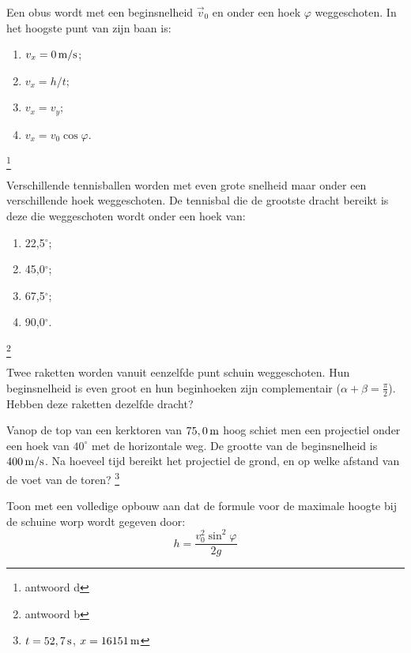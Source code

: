 \documentclass{ximera}
\begin{document}
\begin{exercise} Een obus wordt met een beginsnelheid $\vec{v}_0$ en onder een
hoek $\varphi$ weggeschoten. In het hoogste punt van zijn baan is:
\begin{enumerate}
\item $v_x=0\rm\,m/s$;
\item $v_x=h/t$;
\item $v_x=v_y$;
\item $v_x=v_0\cos{\varphi}$.
\end{enumerate}
\footnote{antwoord d}

\end{exercise}

\begin{exercise} Verschillende tennisballen worden met even grote snelheid maar
onder een verschillende hoek weggeschoten. De tennisbal die de
grootste dracht bereikt is deze die weggeschoten wordt onder een
hoek van:
\begin{enumerate}
\item 22,5$^\circ$;
\item 45,0$^\circ$;
\item 67,5$^\circ$;
\item 90,0$^\circ$.
\end{enumerate}
\footnote{antwoord b}

\end{exercise}

\begin{exercise} Twee raketten worden vanuit eenzelfde punt schuin
weggeschoten. Hun beginsnelheid is even groot en hun beginhoeken
zijn complementair ($\alpha+\beta=\frac{\pi}{2}$). Hebben deze
raketten dezelfde dracht?

\end{exercise}

\begin{exercise} Vanop de top van een kerktoren van $75,0\rm\,m$ hoog schiet
men een projectiel onder een hoek van $40^\circ$ met de horizontale
weg. De grootte van de beginsnelheid is $400\rm\,m/s$. Na hoeveel
tijd bereikt het projectiel de grond, en op welke afstand van de
voet van de toren? \footnote{$t=52,7\rm\,s$, $x=16151\rm\,m$}

\end{exercise}

\begin{exercise} Toon met een volledige opbouw aan dat de formule voor de
maximale hoogte bij de schuine worp wordt gegeven door:
\begin{displaymath}
h=\frac{v_0^2\sin^2{\varphi}}{2g}
\end{displaymath}

\end{exercise}
\end{document}
